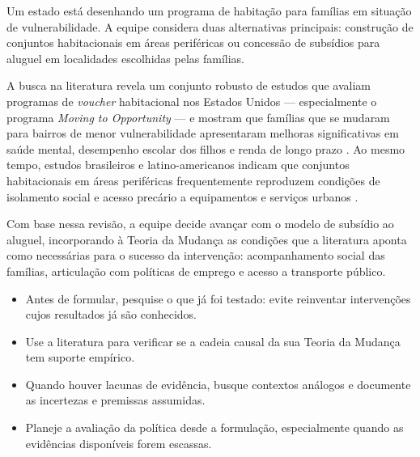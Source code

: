 \documentclass[12pt, a4paper, openany]{book}
\begin{document}
\begin{exemplobox}
Um estado está desenhando um programa de habitação para famílias em situação
de vulnerabilidade. A equipe considera duas alternativas principais:
construção de conjuntos habitacionais em áreas periféricas ou concessão de
subsídios para aluguel em localidades escolhidas pelas famílias.

A busca na literatura revela um conjunto robusto de estudos que avaliam
programas de \textit{voucher} habitacional nos Estados Unidos --- especialmente
o programa \textit{Moving to Opportunity} --- e mostram que famílias que se
mudaram para bairros de menor vulnerabilidade apresentaram melhoras
significativas em saúde mental, desempenho escolar dos filhos e renda de
longo prazo \citep{Chetty2016}. Ao mesmo tempo, estudos brasileiros e
latino-americanos indicam que conjuntos habitacionais em áreas periféricas
frequentemente reproduzem condições de isolamento social e acesso precário a
equipamentos e serviços urbanos \citep{Cardoso2013}.

Com base nessa revisão, a equipe decide avançar com o modelo de subsídio ao
aluguel, incorporando à Teoria da Mudança as condições que a literatura
aponta como necessárias para o sucesso da intervenção: acompanhamento social
das famílias, articulação com políticas de emprego e acesso a transporte
público.
\end{exemplobox}

\begin{notabox}
\begin{itemize}[leftmargin=*]
  \item Antes de formular, pesquise o que já foi testado: evite reinventar
    intervenções cujos resultados já são conhecidos.
  \item Use a literatura para verificar se a cadeia causal da sua Teoria da
    Mudança tem suporte empírico.
  \item Quando houver lacunas de evidência, busque contextos análogos e
    documente as incertezas e premissas assumidas.
  \item Planeje a avaliação da política desde a formulação, especialmente
    quando as evidências disponíveis forem escassas.
\end{itemize}
\end{notabox}

\end{document}
